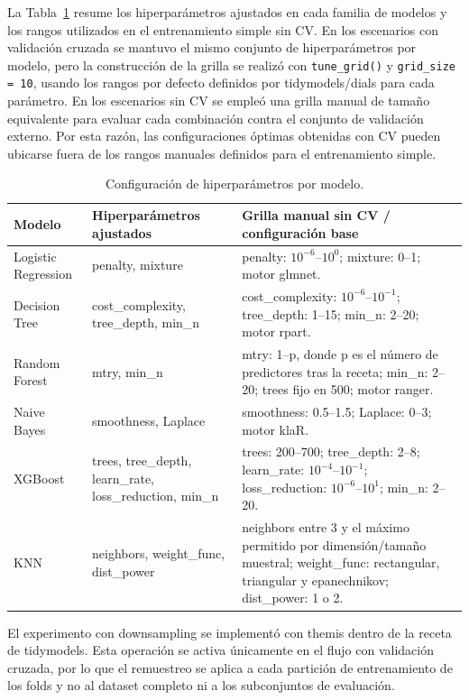 La Tabla~\ref{tab:config-modelos} resume los hiperparámetros ajustados en cada
familia de modelos y los rangos utilizados en el entrenamiento simple sin CV.
En los escenarios con validación cruzada se mantuvo el mismo conjunto de
hiperparámetros por modelo, pero la construcción de la grilla se realizó con
\texttt{tune\_grid()} y \texttt{grid\_size = 10}, usando los rangos por defecto
definidos por tidymodels/dials para cada parámetro. En los escenarios sin CV se
empleó una grilla manual de tamaño equivalente para evaluar cada combinación
contra el conjunto de validación externo. Por esta razón, las configuraciones
óptimas obtenidas con CV pueden ubicarse fuera de los rangos manuales definidos
para el entrenamiento simple.

\begin{table}[H]
  \centering
  \caption{Configuración de hiperparámetros por modelo.}
  \label{tab:config-modelos}
  \scriptsize
  \begin{tabular}{p{}p{}p{}}
    \toprule
    \textbf{Modelo} & \textbf{Hiperparámetros ajustados} & \textbf{Grilla manual sin CV / configuración base} \\
    \midrule
    Logistic Regression & penalty, mixture & penalty: $10^{-6}$--$10^{0}$; mixture: 0--1; motor glmnet. \\
    Decision Tree & cost\_complexity, tree\_depth, min\_n & cost\_complexity: $10^{-6}$--$10^{-1}$; tree\_depth: 1--15; min\_n: 2--20; motor rpart. \\
    Random Forest & mtry, min\_n & mtry: 1--p, donde p es el número de predictores tras la receta; min\_n: 2--20; trees fijo en 500; motor ranger. \\
    Naive Bayes & smoothness, Laplace & smoothness: 0.5--1.5; Laplace: 0--3; motor klaR. \\
    XGBoost & trees, tree\_depth, learn\_rate, loss\_reduction, min\_n & trees: 200--700; tree\_depth: 2--8; learn\_rate: $10^{-4}$--$10^{-1}$; loss\_reduction: $10^{-6}$--$10^{1}$; min\_n: 2--20. \\
    KNN & neighbors, weight\_func, dist\_power & neighbors entre 3 y el máximo permitido por dimensión/tamaño muestral; weight\_func: rectangular, triangular y epanechnikov; dist\_power: 1 o 2. \\
    \bottomrule
  \end{tabular}
\end{table}

El experimento con downsampling se implementó con themis dentro de la receta de
tidymodels. Esta operación se activa únicamente en el flujo con validación
cruzada, por lo que el remuestreo se aplica a cada partición de entrenamiento
de los folds y no al dataset completo ni a los subconjuntos de evaluación.

